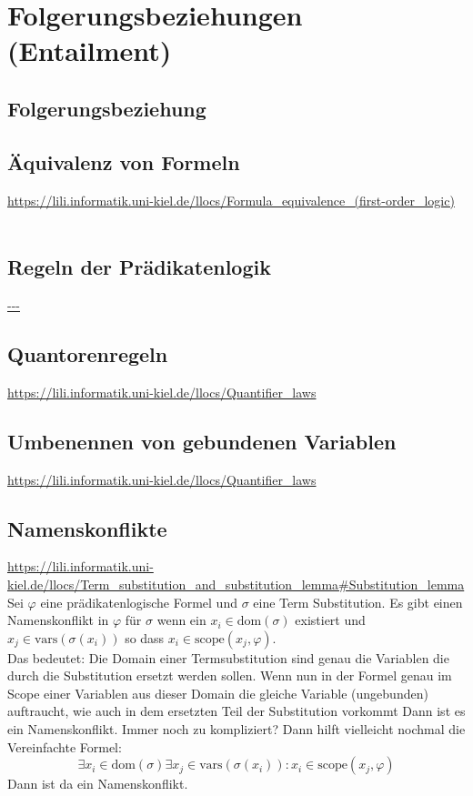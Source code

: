 \documentclass{article}
\begin{document}
    \section{Folgerungsbeziehungen (Entailment)}

    \subsection{Folgerungsbeziehung}\subsection{Äquivalenz von Formeln}
    \url{https://lili.informatik.uni-kiel.de/llocs/Formula_equivalence_(first-order_logic)}\\\\

    \subsection{Regeln der Prädikatenlogik}
    \url{---}\\

    \subsection{Quantorenregeln}
    \url{https://lili.informatik.uni-kiel.de/llocs/Quantifier_laws}\\

    \subsection{Umbenennen von gebundenen Variablen}
    \url{https://lili.informatik.uni-kiel.de/llocs/Quantifier_laws}\\
    
    \subsection{Namenskonflikte}
    \url{https://lili.informatik.uni-kiel.de/llocs/Term_substitution_and_substitution_lemma#Substitution_lemma}\\
    Sei $\varphi$ eine prädikatenlogische Formel und  $\sigma$ eine Term Substitution. Es gibt einen Namenskonflikt in $\varphi$ für $\sigma$ wenn ein $x_i \in \text{dom}(\sigma)$ existiert und $x_j \in \text{vars}(\sigma(x_i))$ so dass $x_i \in \text{scope}(x_j, \varphi)$.\\
    Das bedeutet: Die Domain einer Termsubstitution sind genau die Variablen die durch die Substitution ersetzt werden sollen. Wenn nun in der Formel genau im Scope einer Variablen aus dieser Domain die gleiche Variable (ungebunden) auftraucht, wie auch in dem ersetzten Teil der Substitution vorkommt Dann ist es ein Namenskonflikt. Immer noch zu kompliziert? Dann hilft vielleicht nochmal die Vereinfachte Formel:
    $$ \exists x_i \in \text{dom}(\sigma) \exists x_j \in \text{vars}(\sigma (x_i)): x_i \in \text{scope}(x_j,\varphi)$$
    Dann ist da ein Namenskonflikt.
\end{document}
